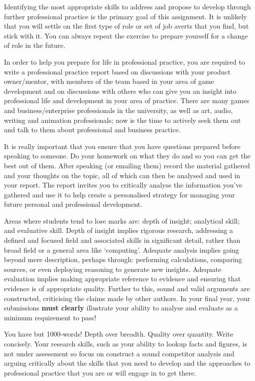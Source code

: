 \documentclass{../../fal_assignment}
\begin{document}
Identifying the most appropriate skills to address and propose to develop through further professional practice is the primary goal of this assignment. It is unlikely that you will settle on the first type of role or set of job averts that you find, but stick with it. You can always repeat the exercise to prepare yourself for a change of role in the future. 

In order to help you prepare for life in professional practice, you are required to write a professional practice report based on discussions with your product owner/mentor, with members of the team based in your area of game development and on discussions with others who can give you an insight into professional life and development in your area of practice. There are many games and business/enterprise professionals in the university, as well as art, audio, writing and animation professionals; now is the time to actively seek them out and talk to them about professional and business practice.

It is really important that you ensure that you have questions prepared before speaking to someone. Do your homework on what they do and so you can get the best out of them. After speaking (or emailing them) record the material gathered and your thoughts on the topic, all of which can then be analysed and used in your report. The report invites you to critically analyse the information you’ve gathered and use it to help create a personalised strategy for managing your future personal and professional development.

Areas where students tend to lose marks are: depth of insight; analytical skill; and evaluative skill. Depth of insight implies rigorous research, addressing a defined and focused field and associated skills in significant detail, rather than broad field or a general area like `computing'. Adequate analysis implies going beyond mere description, perhaps through: performing calculations, comparing sources, or even deploying reasoning to generate new insights. Adequate evaluation implies making appropriate reference to evidence and ensuring that evidence is of appropriate quality. Further to this, sound and valid arguments are constructed, criticising the claims made by other authors. In your final year, your submissions \textbf{must clearly} illustrate your ability to analyse and evaluate as a minimum requirement to pass!

You have but 1000-words! Depth over breadth. Quality over quantity. Write concisely. Your research skills, such as your ability to lookup facts and figures, is not under assessment so focus on construct a sound competitor analysis and arguing critically about the skills that you need to develop and the approaches to professional practice that you are or will engage in to get there.
\end{document}
